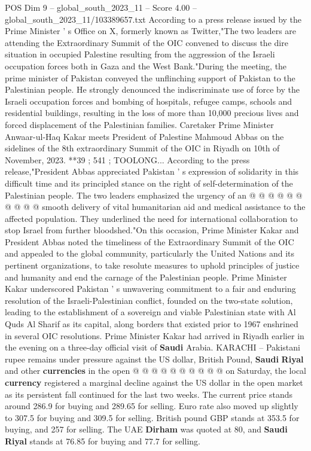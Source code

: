 \begin{textsample}{POS Dim 9 – global\_south\_2023\_11 – Score 4.00 – global\_south\_2023\_11/103389657.txt}  \label{ex:f9_pos_125}
According to a press release issued by the Prime Minister ' s Office on X, formerly known as Twitter,"The two leaders are attending the Extraordinary Summit of the OIC convened to discuss the dire situation in occupied Palestine resulting from the aggression of the Israeli occupation forces both in Gaza and the West Bank."During the meeting, the prime minister of Pakistan conveyed the unflinching support of Pakistan to the Palestinian people.
He strongly denounced the indiscriminate use of force by the Israeli occupation forces and bombing of hospitals, refugee camps, schools and residential buildings, resulting in the loss of more than 10,000 precious lives and forced displacement of the Palestinian families.
Caretaker Prime Minister Anwaar-ul-Haq Kakar meets President of Palestine Mahmoud Abbas on the sidelines of the 8th extraordinary Summit of the OIC in Riyadh on 10th of November, 2023. **39 ; 541 ; TOOLONG...
According to the press release,"President Abbas appreciated Pakistan ' s expression of solidarity in this difficult time and its principled stance on the right of self-determination of the Palestinian people.
The two leaders emphasized the urgency of an @ @ @ @ @ @ @ @ @ @ smooth delivery of vital humanitarian aid and medical assistance to the affected population.
They underlined the need for international collaboration to stop Israel from further bloodshed."On this occasion, Prime Minister Kakar and President Abbas noted the timeliness of the Extraordinary Summit of the OIC and appealed to the global community, particularly the United Nations and its pertinent organizations, to take resolute measures to uphold principles of justice and humanity and end the carnage of the Palestinian people.
Prime Minister Kakar underscored Pakistan ' s unwavering commitment to a fair and enduring resolution of the Israeli-Palestinian conflict, founded on the two-state solution, leading to the establishment of a sovereign and viable Palestinian state with Al Quds Al Sharif as its capital, along borders that existed prior to 1967 enshrined in several OIC resolutions.
Prime Minister Kakar had arrived in Riyadh earlier in the evening on a three-day official visit of \textbf{Saudi} Arabia.
KARACHI -- Pakistani rupee remains under pressure against the US dollar, British Pound, \textbf{Saudi} \textbf{Riyal} and other \textbf{currencies} in the open @ @ @ @ @ @ @ @ @ @ on Saturday, the local \textbf{currency} registered a marginal decline against the US dollar in the open market as its persistent fall continued for the last two weeks.
The current price stands around 286.9 for buying and 289.65 for selling.
Euro rate also moved up slightly to 307.5 for buying and 309.5 for selling.
British pound GBP stands at 353.5 for buying, and 257 for selling.
The UAE \textbf{Dirham} was quoted at 80, and \textbf{Saudi} \textbf{Riyal} stands at 76.85 for buying and 77.7 for selling.

\end{textsample}
